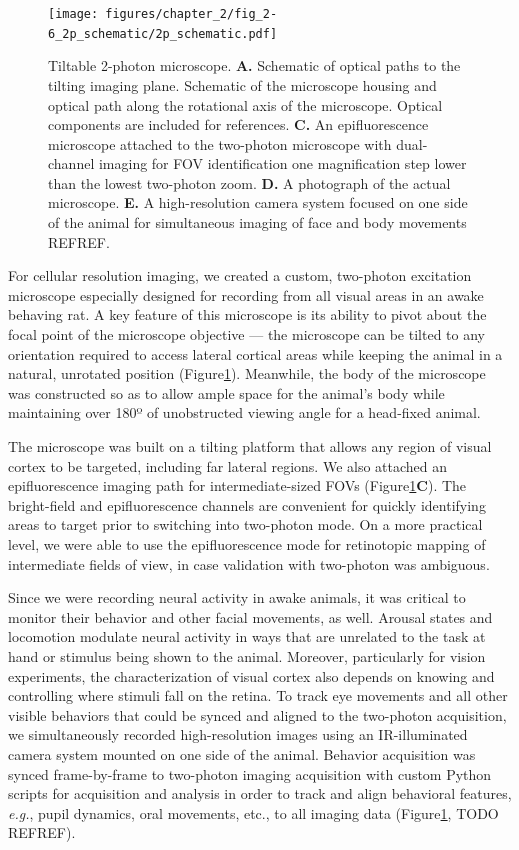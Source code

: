 \begin{figure}[t!]
    \texttt{[image: figures/chapter\_2/fig\_2-6\_2p\_schematic/2p\_schematic.pdf]}
    \vspace{.1in}
    \caption[Tilting two-photon microscope]{Tiltable 2-photon microscope. \textbf{A.} Schematic of optical paths to the tilting imaging plane.  Schematic of the microscope housing and optical path along the rotational axis of the microscope. Optical components are included for references. \textbf{C.} An epifluorescence microscope attached to the two-photon microscope with dual-channel imaging for FOV identification one magnification step lower than the lowest two-photon zoom. \textbf{D.} A photograph of the actual microscope. \textbf{E.} A high-resolution camera system focused on one side of the animal for simultaneous imaging of face and body movements REFREF.
    \label{fig:2p_schematic}}
\end{figure}

For cellular resolution imaging, we created a custom, two-photon excitation microscope especially designed for recording from all visual areas in an awake behaving rat. A key feature of this microscope is its ability to pivot about the focal point of the microscope objective --- the microscope can be tilted to any orientation required to access lateral cortical areas while keeping the animal in a natural, unrotated position (Figure\ref{fig:2p_schematic}). Meanwhile, the body of the microscope was constructed so as to allow ample space for the animal's body while maintaining over 180º of unobstructed viewing angle for a head-fixed animal.

The microscope was built on a tilting platform that allows any region of visual cortex to be targeted, including far lateral regions. We also attached an epifluorescence imaging path for intermediate-sized FOVs (Figure\ref{fig:2p_schematic}\textbf{C}). The bright-field and epifluorescence channels are convenient for quickly identifying areas to target prior to switching into two-photon mode. On a more practical level, we were able to use the epifluorescence mode for retinotopic mapping of intermediate fields of view, in case validation with two-photon was ambiguous. 

Since we were recording neural activity in awake animals, it was critical to monitor their behavior and other facial movements, as well. Arousal states and locomotion modulate neural activity in ways that are unrelated to the task at hand or stimulus being shown to the animal. Moreover, particularly for vision experiments, the characterization of visual cortex also depends on knowing and controlling where stimuli fall on the retina. To track eye movements and all other visible behaviors that could be synced and aligned to the two-photon acquisition, we simultaneously recorded high-resolution images using an IR-illuminated camera system mounted on one side of the animal. Behavior acquisition was synced frame-by-frame to two-photon imaging acquisition with custom Python scripts for acquisition and analysis in order to track and align behavioral features, \textit{e.g.}, pupil dynamics, oral movements, etc., to all imaging data (Figure\ref{fig:2p_schematic}, TODO REFREF).

